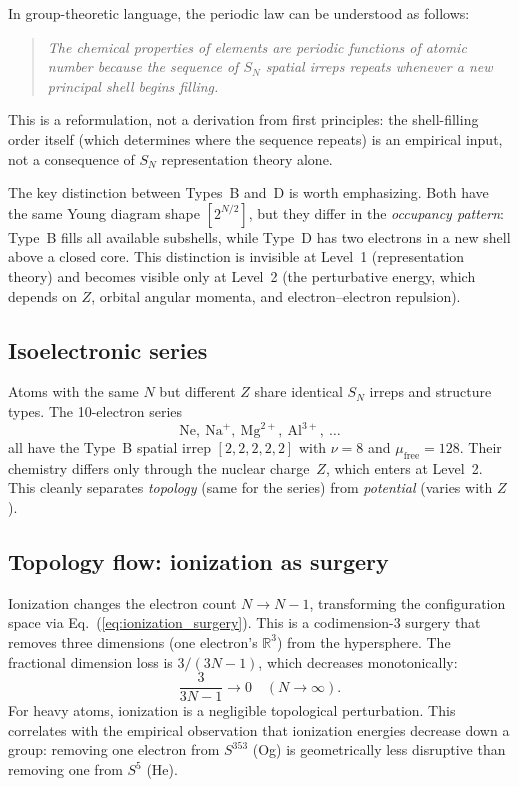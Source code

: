 \documentclass[aps,prl,twocolumn,superscriptaddress,longbibliography]{revtex4-2}
\newcommand{\mufree}{\mu_{\mathrm{free}}}
\begin{document}
In group-theoretic language, the periodic law can be understood as
follows:
\begin{quote}
\emph{The chemical properties of elements are periodic functions of
atomic number because the sequence of $S_N$ spatial irreps repeats
whenever a new principal shell begins filling.}
\end{quote}
This is a reformulation, not a derivation from first principles: the
shell-filling order itself (which determines where the sequence
repeats) is an empirical input, not a consequence of $S_N$
representation theory alone.

The key distinction between Types~B and~D is worth emphasizing.
Both have the same Young diagram shape $[2^{N/2}]$, but they differ
in the \emph{occupancy pattern}: Type~B fills all available subshells,
while Type~D has two electrons in a new shell above a closed core.
This distinction is invisible at Level~1 (representation theory) and
becomes visible only at Level~2 (the perturbative energy, which
depends on $Z$, orbital angular momenta, and electron--electron
repulsion).

\subsection{Isoelectronic series}
\label{sec:isoelectronic}

Atoms with the same $N$ but different $Z$ share identical $S_N$ irreps
and structure types.  The 10-electron series
\begin{equation}
  \text{Ne},\ \text{Na}^+,\ \text{Mg}^{2+},\ \text{Al}^{3+},\ \ldots
\end{equation}
all have the Type~B spatial irrep $[2,2,2,2,2]$ with $\nu = 8$ and
$\mufree = 128$.  Their chemistry differs only through the nuclear
charge~$Z$, which enters at Level~2.  This cleanly separates
\emph{topology} (same for the series) from \emph{potential} (varies
with $Z$).

\subsection{Topology flow: ionization as surgery}
\label{sec:topology_flow}

Ionization changes the electron count $N \to N - 1$, transforming the
configuration space via Eq.~(\ref{eq:ionization_surgery}).  This is a
codimension-3 surgery that removes three dimensions (one electron's
$\mathbb{R}^3$) from the hypersphere.  The fractional dimension loss
is $3/(3N-1)$, which decreases monotonically:
\begin{equation}
  \frac{3}{3N - 1} \to 0 \quad (N \to \infty).
\end{equation}
For heavy atoms, ionization is a negligible topological perturbation.
This correlates with the empirical observation that ionization energies
decrease down a group: removing one electron from $S^{353}$ (Og) is
geometrically less disruptive than removing one from $S^5$ (He).
\end{document}
